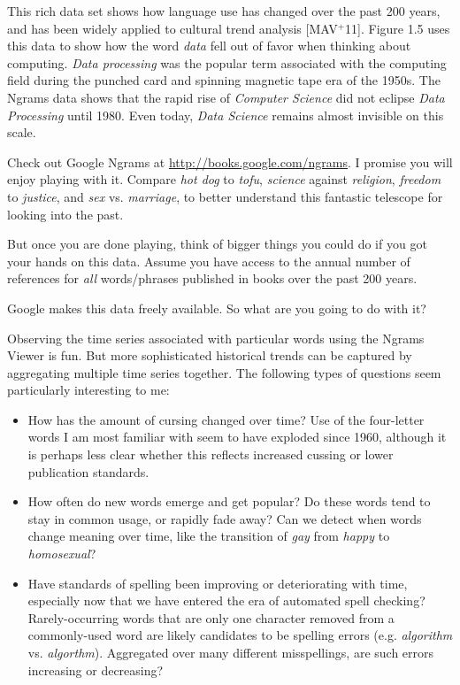 \documentclass[10pt]{article}
\begin{document}
This rich data set shows how language use has changed over the past 200 years, and has been widely applied to cultural trend analysis [MAV$^{+}$11]. Figure 1.5 uses this data to show how the word \textit{data} fell out of favor when thinking about computing. \textit{Data processing} was the popular term associated with the computing field during the punched card and spinning magnetic tape era of the 1950s. The Ngrams data shows that the rapid rise of \textit{Computer Science} did not eclipse \textit{Data Processing} until 1980. Even today, \textit{Data Science} remains almost invisible on this scale.

Check out Google Ngrams at \href{http://books.google.com/ngrams}{http://books.google.com/ngrams}. I promise you will enjoy playing with it. Compare \textit{hot dog} to \textit{tofu}, \textit{science} against \textit{religion}, \textit{freedom} to \textit{justice}, and \textit{sex} vs. \textit{marriage}, to better understand this fantastic telescope for looking into the past.

But once you are done playing, think of bigger things you could do if you got your hands on this data. Assume you have access to the annual number of references for \textit{all} words/phrases published in books over the past 200 years.

Google makes this data freely available. So what are you going to do with it?

Observing the time series associated with particular words using the Ngrams Viewer is fun. But more sophisticated historical trends can be captured by aggregating multiple time series together. The following types of questions seem particularly interesting to me:

\begin{itemize}
  \item How has the amount of cursing changed over time? Use of the four-letter words I am most familiar with seem to have exploded since 1960, although it is perhaps less clear whether this reflects increased cussing or lower publication standards.
  \item How often do new words emerge and get popular? Do these words tend to stay in common usage, or rapidly fade away? Can we detect when words change meaning over time, like the transition of \textit{gay} from \textit{happy} to \textit{homosexual}?
  \item Have standards of spelling been improving or deteriorating with time, especially now that we have entered the era of automated spell checking? Rarely-occurring words that are only one character removed from a commonly-used word are likely candidates to be spelling errors (e.g. \textit{algorithm} vs. \textit{algorthm}). Aggregated over many different misspellings, are such errors increasing or decreasing?
\end{itemize}
\end{document}

